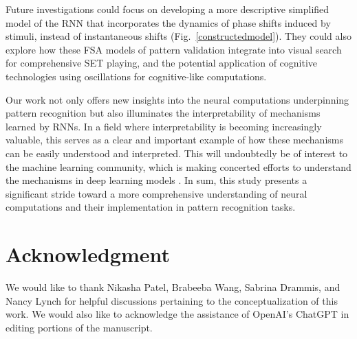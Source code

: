 \documentclass[conference]{IEEEtran}
\begin{document}
Future investigations could focus on developing a more descriptive simplified model of the RNN that incorporates the dynamics of phase shifts induced by stimuli, instead of instantaneous shifts (Fig.~\ref{constructedmodel}). They could also explore how these FSA models of pattern validation integrate into visual search for comprehensive SET playing, and the potential application of cognitive technologies using oscillations for cognitive-like computations.

Our work not only offers new insights into the neural computations underpinning pattern recognition but also illuminates the interpretability of mechanisms learned by RNNs. In a field where interpretability is becoming increasingly valuable, this serves as a clear and important example of how these mechanisms can be easily understood and interpreted. This will undoubtedly be of interest to the machine learning community, which is making concerted efforts to understand the mechanisms in deep learning models \cite{nanda2023progress}. In sum, this study presents a significant stride toward a more comprehensive understanding of neural computations and their implementation in pattern recognition tasks.

\section*{Acknowledgment}

We would like to thank Nikasha Patel, Brabeeba Wang, Sabrina Drammis, and Nancy Lynch for helpful discussions pertaining to the conceptualization of this work. We would also like to acknowledge the assistance of OpenAI's ChatGPT in editing portions of the manuscript.
\end{document}
